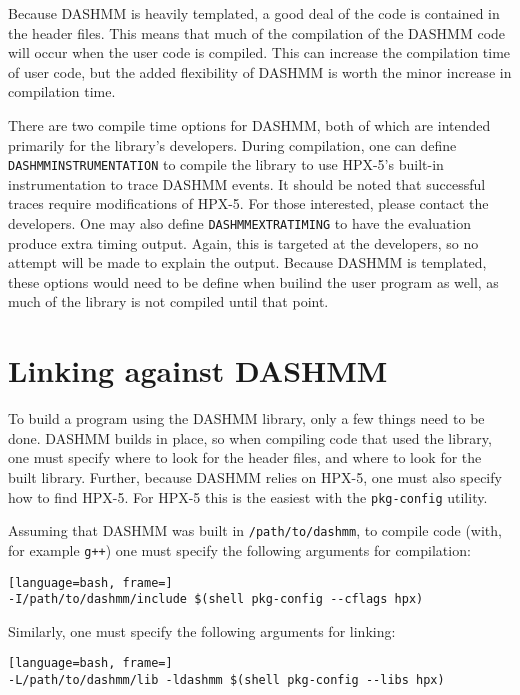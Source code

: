 Because DASHMM is heavily templated, a good deal of the code is
contained in the header files. This means that much of the compilation
of the DASHMM code will occur when the user code is compiled. This can
increase the compilation time of user code, but the added flexibility
of DASHMM is worth the minor increase in compilation time.

There are two compile time options for DASHMM, both of which are intended
primarily for the library's developers. During compilation, one can define
{\tt DASHMMINSTRUMENTATION} to compile the library to use HPX-5's built-in
instrumentation to trace DASHMM events. It should be noted that successful
traces require modifications of HPX-5. For those interested, please contact
the developers. One may also define {\tt DASHMMEXTRATIMING} to have the
evaluation produce extra timing output. Again, this is targeted at the
developers, so no attempt will be made to explain the output. Because
DASHMM is templated, these options would need to be define when builind the
user program as well, as much of the library is not compiled until that point.

\section{Linking against DASHMM}

To build a program using the DASHMM library, only a few things need to
be done. DASHMM builds in place, so when compiling code that used the
library, one must specify where to look for the header files, and
where to look for the built library. Further, because DASHMM relies on
HPX-5, one must also specify how to find HPX-5. For HPX-5 this is the
easiest with the {\tt pkg-config} utility.

Assuming that DASHMM was built in {\tt /path/to/dashmm}, to compile
code (with, for example {\tt g++}) one must specify the following
arguments for compilation:

\begin{lstlisting}[language=bash, frame=]
-I/path/to/dashmm/include $(shell pkg-config --cflags hpx)
\end{lstlisting}

\noindent Similarly, one must specify the following arguments for linking:

\begin{lstlisting}[language=bash, frame=]
-L/path/to/dashmm/lib -ldashmm $(shell pkg-config --libs hpx)
\end{lstlisting}

